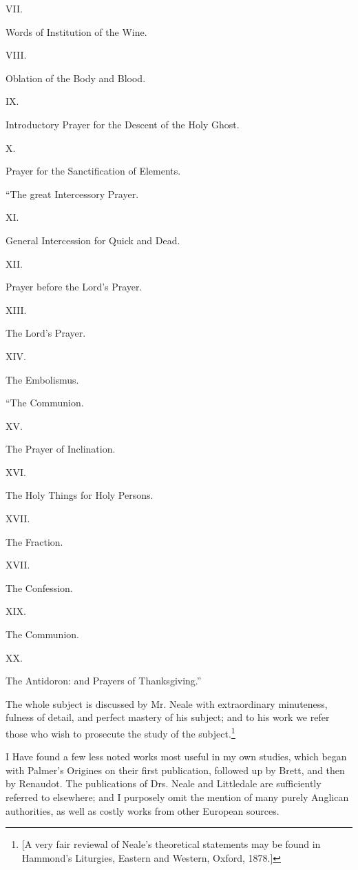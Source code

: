 VII.

Words of Institution of the Wine.

VIII.

Oblation of the Body and Blood.

IX.

Introductory Prayer for the Descent of the Holy Ghost.

X.

Prayer for the Sanctification of Elements.

“The great Intercessory Prayer.

XI.

General Intercession for Quick and Dead.

XII.

Prayer before the Lord’s Prayer.

XIII.

The Lord’s Prayer.

XIV.

The Embolismus.

“The Communion.

XV.

The Prayer of Inclination.

XVI.

The Holy Things for Holy Persons.

XVII.

The Fraction.

XVII.

The Confession.

XIX.

The Communion.

XX.

The Antidoron: and Prayers of Thanksgiving.”

The whole subject is discussed by Mr. Neale with extraordinary minuteness, fulness of detail, and perfect mastery of his subject; and to his work we refer those who wish to prosecute the study of the subject.\footnote{\par{}  [A very fair reviewal of Neale’s theoretical statements may be found in Hammond’s Liturgies, Eastern and Western, Oxford, 1878.]}

I Have found a few less noted works most useful in my own studies, which began with Palmer’s Origines on their first publication, followed up by Brett, and then by Renaudot. The publications of Drs. Neale and Littledale are sufficiently referred to elsewhere; and I purposely omit the mention of many purely Anglican authorities, as well as costly works from other European sources.

